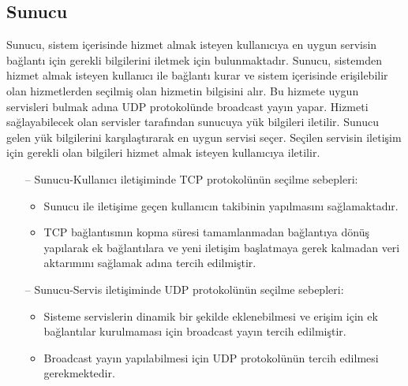 \documentclass[12pt]{article}
\begin{document}
\begin{justify}
\subsection{Sunucu}
Sunucu, sistem içerisinde hizmet almak isteyen kullanıcıya en uygun servisin bağlantı için gerekli bilgilerini iletmek için bulunmaktadır. Sunucu, sistemden hizmet almak isteyen kullanıcı ile bağlantı kurar ve sistem içerisinde erişilebilir olan hizmetlerden seçilmiş olan hizmetin bilgisini alır. Bu hizmete uygun servisleri bulmak adına UDP protokolünde broadcast yayın yapar. Hizmeti sağlayabilecek olan servisler tarafından sunucuya yük bilgileri iletilir. Sunucu gelen yük bilgilerini karşılaştırarak en uygun servisi seçer. Seçilen servisin iletişim için gerekli olan bilgileri hizmet almak isteyen kullanıcıya iletilir.
\begin{enumerate}
    \item[--] Sunucu-Kullanıcı iletişiminde TCP protokolünün seçilme sebepleri:
    \begin{itemize}
        \item Sunucu ile iletişime geçen kullanıcın takibinin yapılmasını sağlamaktadır.
        \item TCP bağlantısının kopma süresi tamamlanmadan bağlantıya dönüş yapılarak ek bağlantılara ve yeni iletişim başlatmaya gerek kalmadan veri aktarımını sağlamak adına tercih edilmiştir.
    \end{itemize}
    \item[--] Sunucu-Servis iletişiminde UDP protokolünün seçilme sebepleri:
    \begin{itemize}
        \item Sisteme servislerin dinamik bir şekilde eklenebilmesi ve erişim için ek bağlantılar kurulmaması için broadcast yayın tercih edilmiştir.
        \item  Broadcast yayın yapılabilmesi için UDP protokolünün tercih edilmesi gerekmektedir.
    \end{itemize}
\end{enumerate}



\end{justify}
\end{document}
